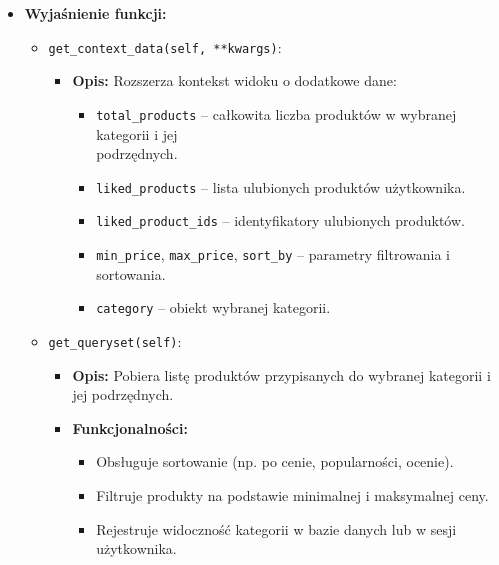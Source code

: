 \documentclass[12pt,a4paper,oneside]{article}
\theoremstyle{definition}
\numberwithin{equation}{section}
\begin{document}
\begin{itemize}
    \item \textbf{Wyjaśnienie funkcji:}
    \begin{itemize}
        \item \texttt{get\_context\_data(self, **kwargs)}:
        \begin{itemize}
            \item \textbf{Opis:} Rozszerza kontekst widoku o dodatkowe dane:
            \begin{itemize}
                \item \texttt{total\_products} – całkowita liczba produktów w wybranej kategorii i jej\\ podrzędnych.
                \item \texttt{liked\_products} – lista ulubionych produktów użytkownika.
                \item \texttt{liked\_product\_ids} – identyfikatory ulubionych produktów.
                \item \texttt{min\_price}, \texttt{max\_price}, \texttt{sort\_by} – parametry filtrowania i sortowania.
                \item \texttt{category} – obiekt wybranej kategorii.
            \end{itemize}
        \end{itemize}
        \item \texttt{get\_queryset(self)}:
        \begin{itemize}
            \item \textbf{Opis:} Pobiera listę produktów przypisanych do wybranej kategorii i jej podrzędnych.
            \item \textbf{Funkcjonalności:}
            \begin{itemize}
                \item Obsługuje sortowanie (np. po cenie, popularności, ocenie).
                \item Filtruje produkty na podstawie minimalnej i maksymalnej ceny.
                \item Rejestruje widoczność kategorii w bazie danych lub w sesji użytkownika.
            \end{itemize}
        \end{itemize}
    \end{itemize}


\end{itemize}
\end{document}
